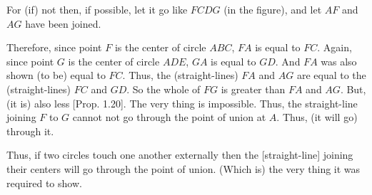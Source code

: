 \begin{Parallel}{}{}
{For (if) not then, if possible, let it go like $FCDG$ (in the figure), and let $AF$ and
$AG$ have been joined.

Therefore, since point $F$ is the center of circle $ABC$, $FA$ is equal to $FC$.
Again, since point $G$ is the center of circle $ADE$, $GA$ is equal to $GD$.
And $FA$ was also shown (to be)  equal to $FC$. Thus, the (straight-lines)
$FA$ and $AG$ are equal to the (straight-lines) $FC$ and $GD$. So the whole
of $FG$ is greater than $FA$ and $AG$. But, (it is) also less [Prop. 1.20].
The very thing is impossible. Thus, the straight-line joining $F$ to $G$
cannot not go through the point of union at $A$. Thus, (it will go) through it.

Thus, if two circles touch one another externally then the [straight-line]
joining their centers will go through the point of union. (Which is)
the very thing it was required to show.}
\end{Parallel}

